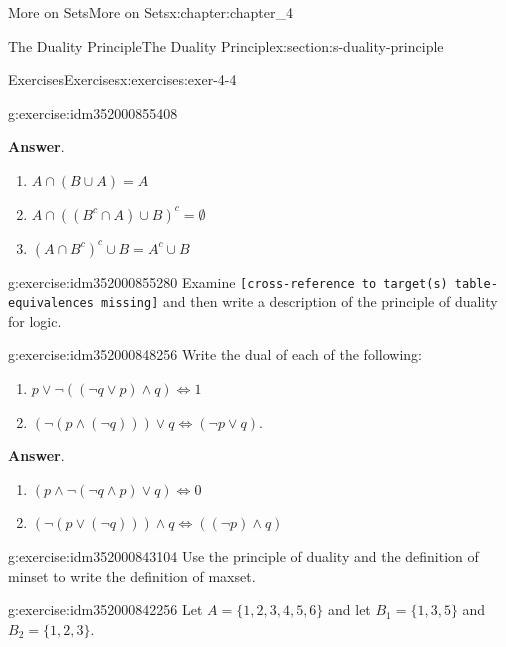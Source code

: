 \documentclass[oneside,10pt,]{book}
\newcommand{\blocktitlefont}{\relax}
\newcommand{\mono}[1]{\texttt{#1}}
\begin{document}
\begin{chapterptx}{More on Sets}{}{More on Sets}{}{}{x:chapter:chapter_4}
\begin{sectionptx}{The Duality Principle}{}{The Duality Principle}{}{}{x:section:s-duality-principle}
\begin{exercises-subsection}{Exercises}{}{Exercises}{}{}{x:exercises:exer-4-4}
\begin{divisionexercise}{1}{}{}{g:exercise:idm352000855408}
\begin{enumerate}[label=(\alph*)]
\end{enumerate}
%
\par\smallskip%
\noindent\textbf{\blocktitlefont Answer}.\hypertarget{g:answer:idm352000851680}{}\quad{}%
\begin{enumerate}[label=(\alph*)]
\item{}\(\displaystyle A\cap (B\cup A)=A\)%
\item{}\(\displaystyle A \cap \left(\left(B^c\cap A\right)\cup B\right)^c=\emptyset\)%
\item{}\(\displaystyle \left(A\cap B^c\right)^c\cup B=A^c\cup B\)%
\end{enumerate}
%
\end{divisionexercise}%
\begin{divisionexercise}{2}{}{}{g:exercise:idm352000855280}%
Examine \mono{[cross-reference to target(s) \textquotedbl{}table-equivalences\textquotedbl{} missing]} and then write a description of the principle of duality for logic.%
\end{divisionexercise}%
\begin{divisionexercise}{3}{}{}{g:exercise:idm352000848256}%
Write the dual of each of the following:%
\begin{enumerate}[label=(\alph*)]
\item{}\(\displaystyle p\lor \neg ((\neg q\lor p)\land q)\Leftrightarrow 1\)%
\item{}\((\neg (p \land  (\neg  q ))) \lor  q\Leftrightarrow (\neg p \lor  q)\).%
\end{enumerate}
%
\par\smallskip%
\noindent\textbf{\blocktitlefont Answer}.\hypertarget{g:answer:idm352001266480}{}\quad{}%
\begin{enumerate}[label=(\alph*)]
\item{}\(\displaystyle (p \land \neg (\neg  q \land p)\lor q) \Leftrightarrow 0\)%
\item{}\(\displaystyle (\neg (p \lor  (\neg q)))\land q \Leftrightarrow ((\neg p) \land q)\)%
\end{enumerate}
%
\end{divisionexercise}%
\begin{divisionexercise}{4}{}{}{g:exercise:idm352000843104}%
Use the principle of duality and the definition of minset to write the definition of maxset.%
\end{divisionexercise}%
\begin{divisionexercise}{5}{}{}{g:exercise:idm352000842256}%
Let \(A = \{1,2, 3,4, 5, 6\}\) and let \(B_1 = \{1, 3, 5\}\) and \(B _2 = \{1,2, 3\}\).%

\end{divisionexercise}
\end{exercises-subsection}
\end{sectionptx}
\end{chapterptx}
\end{document}
